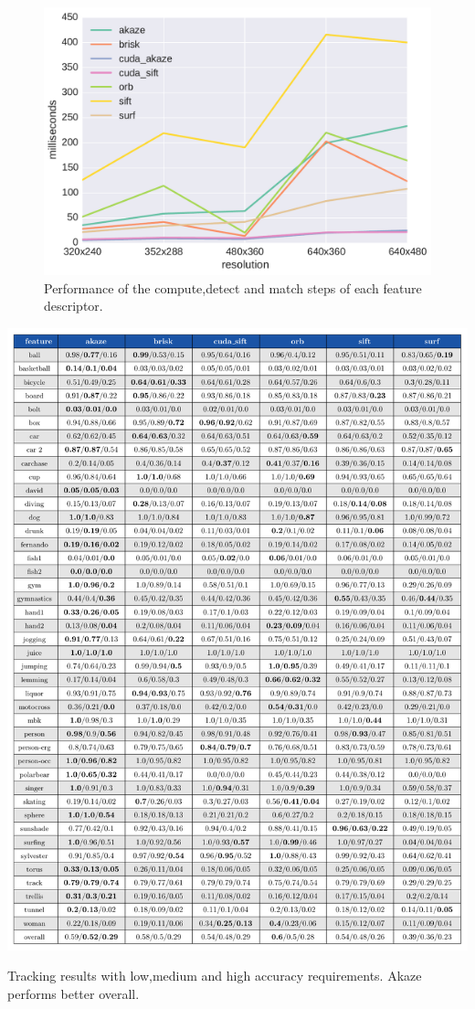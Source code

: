 \begin{figure}
	\includegraphics[width=0.95\linewidth]{imgs/tracker_fps.pdf}
\vspace{-2.5mm}	
\caption{Performance of the compute,detect and match steps of each feature descriptor.}
\label{fig:speed}
\end{figure}



\begin{table}[h]
\centerline{%
		\includegraphics[width=0.98\linewidth]{tables/tracking_precision.pdf}}
    \vspace{-2mm} 
	\caption{Tracking results with low,medium and high accuracy requirements. Akaze performs better overall.}
	\label{table:taccuracy}
\end{table}